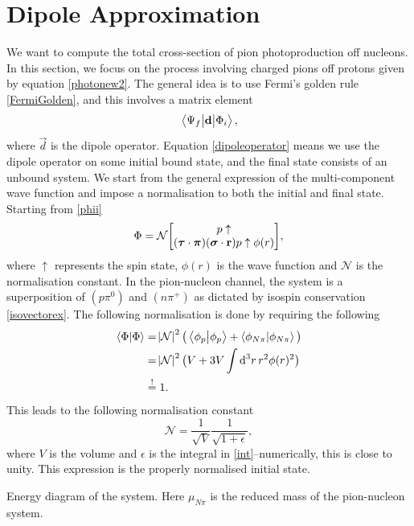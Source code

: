 \section{Dipole Approximation}\label{sec:dipoleapprox}
We want to compute the total cross-section of pion photoproduction off nucleons. In this section, we focus on the process involving charged pions off protons given by equation \eqref{photonew2}. The general idea is to use Fermi's golden rule \eqref{FermiGolden}, and this involves a matrix element
\begin{equation}\label{dipoleoperator}
	\mel{\Psi_f}{\bm{\mathrm{d}}}{\Phi_i},
\end{equation}
where $\vec{d}$ is the dipole operator. Equation \eqref{dipoleoperator} means we use the dipole operator on some initial bound state, and the final state consists of an unbound system. We start from the general expression of the multi-component wave function and impose a normalisation to both the initial and final state. Starting from \eqref{phii}
\begin{align}\label{finalphi}
	\Phi = \mathcal{N} \mqty[p\uparrow \\ (\vec{\tau}\cdot \vec{\pi})(\vec{\sigma}\cdot \vec{r})p\uparrow \phi(r)],
\end{align}
where $\uparrow$ represents the spin state, $\phi(r)$ is the wave function and $\mathcal{N}$ is the normalisation constant. In the pion-nucleon channel, the system is a superposition of $(p\pi^0)$ and $(n\pi^+)$ as dictated by isospin conservation \eqref{isovectorex}. The following normalisation is done by requiring the following
\begin{align}
	\braket{\Phi}{\Phi} &= \abs{\mathcal{N}}^2 \big( \braket{\phi_p}{\phi_p}+ \braket{\phi_{N\pi}}{\phi_{N\pi}} \big) \\
	&= \abs{\mathcal{N}}^2 \big( V+3V\int \text{d}^3r \, r^2 \phi(r)^2 \big)\label{int} \\
	&\stackrel{!}{=} 1.
\end{align} 
This leads to the following normalisation constant
\begin{equation}
	\mathcal{N} = \frac{1}{\sqrt{V}}\frac{1}{\sqrt{1+\epsilon}},
\end{equation}
where $V$ is the volume and $\epsilon$ is the integral in \eqref{int}--numerically, this is close to unity. This expression is the properly normalised initial state. 
\begin{marginfigure}
	\centering
	
	\caption{Energy diagram of the system. Here $\mu_{N\pi}$ is the reduced mass of the pion-nucleon system.}
	\label{fig:qenergy}
\end{marginfigure}

